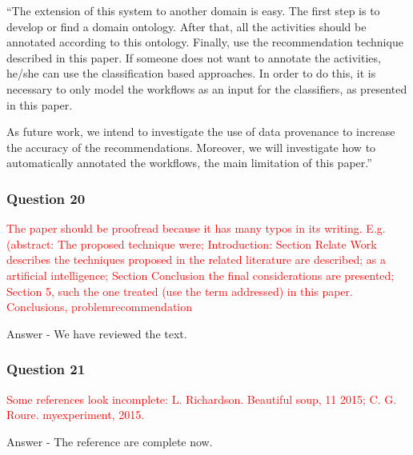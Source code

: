 \documentclass{report}
\begin{document}
``The extension of this system to another domain is easy. The first step is to develop or find a domain ontology. After that, all the activities should be annotated according to this ontology. Finally, use the recommendation technique described in this paper. If someone does not want to annotate the activities, he/she can use the classification based approaches. In order to do this, it is necessary to only model the workflows as an input for the classifiers, as presented in this paper.

As future work, we intend to investigate the use of data provenance to increase the accuracy of the recommendations. 
Moreover, we will investigate how to automatically annotated the workflows, the main limitation of this paper.''


\subsubsection{Question 20}
\textcolor{red}{The paper should be proofread because it has many typos in its writing.
E.g. (abstract: The proposed technique were; Introduction: Section Relate
Work describes the techniques proposed in the related literature are
described; as a artificial intelligence; Section Conclusion the final
considerations are presented; Section 5, such the one treated (use the term
addressed) in this paper. Conclusions, problemrecommendation}

Answer - We have reviewed the text.


\subsubsection{Question 21}
\textcolor{red}{Some references look incomplete: L. Richardson. Beautiful soup, 11 2015;
	C. G. Roure. myexperiment, 2015.}

Answer - The reference are complete now.


	
	
	
\end{document}
